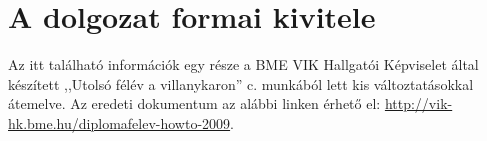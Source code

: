 \chapter{A dolgozat formai kivitele}

Az itt található információk egy része a BME VIK Hallgatói Képviselet által készített ,,Utolsó félév a villanykaron'' c. munkából lett kis változtatásokkal átemelve. Az eredeti dokumentum az alábbi linken érhető el: \url{http://vik-hk.bme.hu/diplomafelev-howto-2009}.



